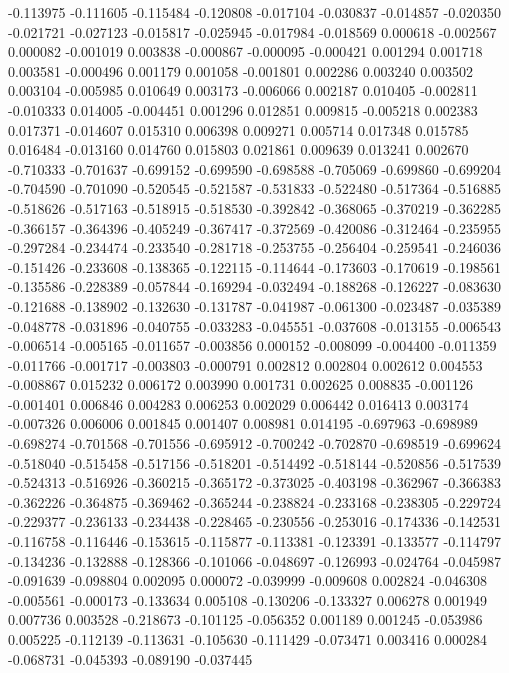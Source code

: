 -0.113975
-0.111605
-0.115484
-0.120808
-0.017104
-0.030837
-0.014857
-0.020350
-0.021721
-0.027123
-0.015817
-0.025945
-0.017984
-0.018569
0.000618
-0.002567
0.000082
-0.001019
0.003838
-0.000867
-0.000095
-0.000421
0.001294
0.001718
0.003581
-0.000496
0.001179
0.001058
-0.001801
0.002286
0.003240
0.003502
0.003104
-0.005985
0.010649
0.003173
-0.006066
0.002187
0.010405
-0.002811
-0.010333
0.014005
-0.004451
0.001296
0.012851
0.009815
-0.005218
0.002383
0.017371
-0.014607
0.015310
0.006398
0.009271
0.005714
0.017348
0.015785
0.016484
-0.013160
0.014760
0.015803
0.021861
0.009639
0.013241
0.002670
-0.710333
-0.701637
-0.699152
-0.699590
-0.698588
-0.705069
-0.699860
-0.699204
-0.704590
-0.701090
-0.520545
-0.521587
-0.531833
-0.522480
-0.517364
-0.516885
-0.518626
-0.517163
-0.518915
-0.518530
-0.392842
-0.368065
-0.370219
-0.362285
-0.366157
-0.364396
-0.405249
-0.367417
-0.372569
-0.420086
-0.312464
-0.235955
-0.297284
-0.234474
-0.233540
-0.281718
-0.253755
-0.256404
-0.259541
-0.246036
-0.151426
-0.233608
-0.138365
-0.122115
-0.114644
-0.173603
-0.170619
-0.198561
-0.135586
-0.228389
-0.057844
-0.169294
-0.032494
-0.188268
-0.126227
-0.083630
-0.121688
-0.138902
-0.132630
-0.131787
-0.041987
-0.061300
-0.023487
-0.035389
-0.048778
-0.031896
-0.040755
-0.033283
-0.045551
-0.037608
-0.013155
-0.006543
-0.006514
-0.005165
-0.011657
-0.003856
0.000152
-0.008099
-0.004400
-0.011359
-0.011766
-0.001717
-0.003803
-0.000791
0.002812
0.002804
0.002612
0.004553
-0.008867
0.015232
0.006172
0.003990
0.001731
0.002625
0.008835
-0.001126
-0.001401
0.006846
0.004283
0.006253
0.002029
0.006442
0.016413
0.003174
-0.007326
0.006006
0.001845
0.001407
0.008981
0.014195
-0.697963
-0.698989
-0.698274
-0.701568
-0.701556
-0.695912
-0.700242
-0.702870
-0.698519
-0.699624
-0.518040
-0.515458
-0.517156
-0.518201
-0.514492
-0.518144
-0.520856
-0.517539
-0.524313
-0.516926
-0.360215
-0.365172
-0.373025
-0.403198
-0.362967
-0.366383
-0.362226
-0.364875
-0.369462
-0.365244
-0.238824
-0.233168
-0.238305
-0.229724
-0.229377
-0.236133
-0.234438
-0.228465
-0.230556
-0.253016
-0.174336
-0.142531
-0.116758
-0.116446
-0.153615
-0.115877
-0.113381
-0.123391
-0.133577
-0.114797
-0.134236
-0.132888
-0.128366
-0.101066
-0.048697
-0.126993
-0.024764
-0.045987
-0.091639
-0.098804
0.002095
0.000072
-0.039999
-0.009608
0.002824
-0.046308
-0.005561
-0.000173
-0.133634
0.005108
-0.130206
-0.133327
0.006278
0.001949
0.007736
0.003528
-0.218673
-0.101125
-0.056352
0.001189
0.001245
-0.053986
0.005225
-0.112139
-0.113631
-0.105630
-0.111429
-0.073471
0.003416
0.000284
-0.068731
-0.045393
-0.089190
-0.037445
